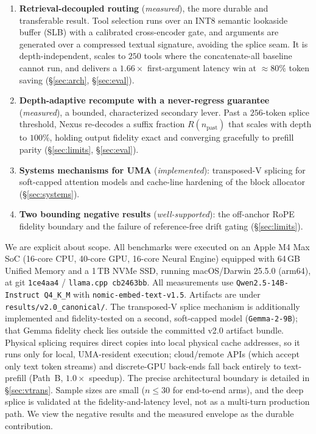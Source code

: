 \documentclass[10pt,conference]{IEEEtran}
\newcommand{\code}[1]{\texttt{\small #1}}
\begin{document}
\begin{enumerate}
  \item \textbf{Retrieval-decoupled routing} (\emph{measured}), the more durable and transferable
  result. Tool selection runs over an INT8 semantic lookaside buffer (SLB) with a calibrated
  cross-encoder gate, and arguments are generated over a compressed textual signature, avoiding the
  splice seam. It is depth-independent, scales to $250$ tools where the concatenate-all baseline
  cannot run, and delivers a $1.66\times$ first-argument latency win at ${\approx}80\%$ token saving
  (\S\ref{sec:arch}, \S\ref{sec:eval}).
  \item \textbf{Depth-adaptive recompute with a never-regress guarantee} (\emph{measured}), a
  bounded, characterized secondary lever. Past a $256$-token splice threshold, Nexus re-decodes a
  suffix fraction $R(n_{\mathrm{past}})$ that scales with depth to $100\%$, holding output fidelity
  exact and converging gracefully to prefill parity (\S\ref{sec:limits}, \S\ref{sec:eval}).
  \item \textbf{Systems mechanisms for UMA} (\emph{implemented}): transposed-V splicing for
  soft-capped attention models and cache-line hardening of the block allocator
  (\S\ref{sec:systems}).
  \item \textbf{Two bounding negative results} (\emph{well-supported}): the off-anchor
  RoPE fidelity boundary and the failure of reference-free drift gating (\S\ref{sec:limits}).
\end{enumerate}

We are explicit about scope. All benchmarks were executed on an Apple M4 Max SoC (16-core CPU, 40-core GPU, 16-core Neural Engine) equipped with 64\,GB Unified Memory and a 1\,TB NVMe SSD, running macOS/Darwin 25.5.0 (arm64), at git \code{1ce4aa4} / \code{llama.cpp cb2463bb}. All measurements use \code{Qwen2.5-14B-Instruct Q4\_K\_M} with \code{nomic-embed-text-v1.5}. Artifacts are under \code{results/v2.0\_canonical/}. The transposed-V splice mechanism is additionally implemented and fidelity-tested on a second, soft-capped model (\code{Gemma-2-9B}); that Gemma fidelity check lies outside the committed v2.0 artifact bundle. Physical splicing requires direct copies into local physical cache addresses, so it runs only for local, UMA-resident execution; cloud/remote APIs (which accept only text token streams) and discrete-GPU back-ends fall back entirely to text-prefill (Path~B, $1.0\times$ speedup). The precise architectural boundary is detailed in \S\ref{sec:vtrans}. Sample sizes are small ($n\!\le\!30$ for end-to-end arms), and the deep splice is validated at the fidelity-and-latency level, not as a multi-turn production path. We view the negative results and the measured envelope as the durable contribution.
\end{document}
